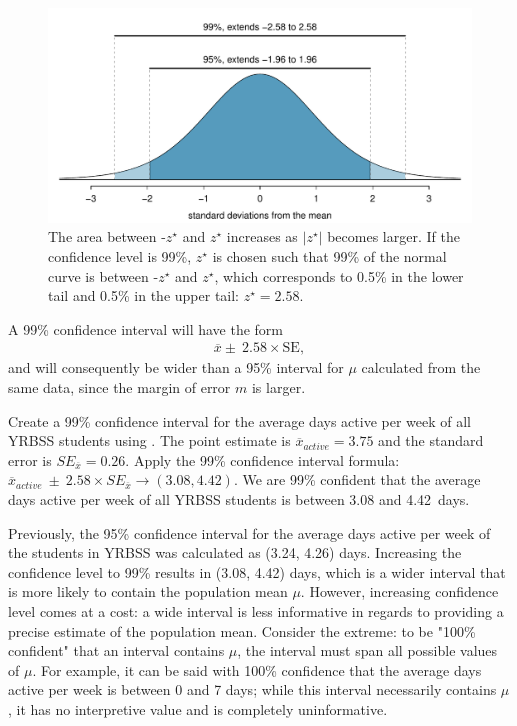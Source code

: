 \begin{spacing}{1.5}
\begin{figure}[h]
	\centering
	\includegraphics[width=\textwidth]
	{ch_inference_foundations_oi_biostat/figures/choosingZForCI/choosingZForCI}
	\caption{The area between -$z^{\star}$ and $z^{\star}$ increases as $|z^{\star}|$ becomes larger. If the confidence level is 99\%, $z^{\star}$ is chosen such that 99\% of the normal curve is between -$z^{\star}$ and $z^{\star}$, which corresponds to 0.5\% in the lower tail and 0.5\% in the upper tail: $z^{\star}=2.58$.}
	\label{choosingZForCI}
\end{figure}
 
A 99\% confidence interval will have the form 
\begin{align}
	\overline{x} \pm \ 2.58 \times \text{SE},
\end{align}
 and will consequently be wider than a 95\% interval for $\mu$ calculated from the same data, since the margin of error $m$ is larger.

\begin{example} {
	Create a 99\% confidence interval for the average days active per week of all YRBSS students using . The point estimate is $\overline{x}_{active} = 3.75$ and the standard error is $SE_{\overline{x}} = 0.26$.}
Apply the 99\% confidence interval formula: $\overline{x}_{active}\ \pm\ 2.58 \times  SE_{\overline{x}} \rightarrow (3.08, 4.42)$. We are 99\% confident that the average days active per week of all YRBSS students is between 3.08 and 4.42~days.
\end{example}

Previously, the 95\% confidence interval for the average days active per week of the students in YRBSS was calculated as (3.24, 4.26) days. Increasing the confidence level to 99\% results in (3.08, 4.42) days, which is a wider interval that is more likely to contain the population mean $\mu$. However, increasing confidence level comes at a cost: a wide interval is less informative in regards to providing a precise estimate of the population mean. Consider the extreme: to be "100\% confident" that an interval contains $\mu$, the interval must span all possible values of $\mu$. For example, it can be said with 100\% confidence that the average days active per week is between 0 and 7 days; while this interval necessarily contains $\mu$, it has no interpretive value and is completely uninformative. 


\end{spacing}

